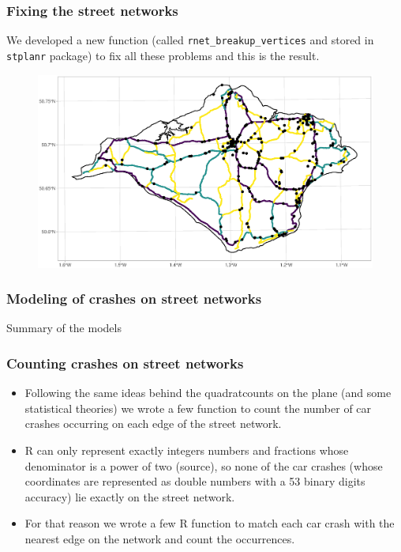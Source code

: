 \documentclass[c,10pt,pdftex]{beamer}
\begin{document}
\begin{frame}
\begin{columns}
\begin{column}{0.5\linewidth}
\begin{figure}
	\end{figure}
\end{column}
\end{columns}
\end{frame}

\begin{frame}
\frametitle{Fixing the street networks}
\vspace{-0.25cm}
We developed a new function (called \texttt{rnet\_breakup\_vertices} and stored in \texttt{stplanr} package) to fix all these problems and this is the result. 
\begin{figure}
	\centering
	\includegraphics[width=\linewidth]{images/breaking_network}
\end{figure}
\end{frame}

\begin{frame}
\frametitle{Modeling of crashes on street networks}
Summary of the models
\end{frame}

\begin{frame}
\frametitle{Counting crashes on street networks}
\vspace{-0.75cm}
\begin{itemize}
	\setlength\itemsep{1em}
	\item Following the same ideas behind the quadratcounts on the plane (and some statistical theories) we wrote a few function to count the number of car crashes occurring on each edge of the street network. 
	\item R can only represent exactly integers numbers and fractions whose denominator is a power of two (source), so none of the car crashes (whose coordinates are represented as double numbers with a 53 binary digits accuracy) lie exactly on the street network.
	\item For that reason we wrote a few R function to match each car crash with the nearest edge on the network and count the occurrences.
\end{itemize}
\end{frame}
\end{document}

